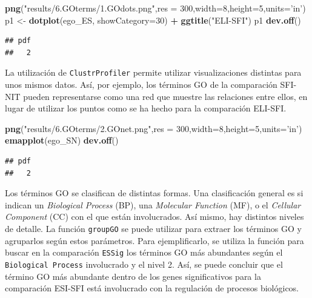 \documentclass[
]{article}
\newenvironment{Shaded}{\begin{snugshade}}{\end{snugshade}}
\newcommand{\DataTypeTok}[1]{\textcolor[rgb]{0.13,0.29,0.53}{#1}}
\newcommand{\DecValTok}[1]{\textcolor[rgb]{0.00,0.00,0.81}{#1}}
\newcommand{\KeywordTok}[1]{\textcolor[rgb]{0.13,0.29,0.53}{\textbf{#1}}}
\newcommand{\NormalTok}[1]{#1}
\newcommand{\OperatorTok}[1]{\textcolor[rgb]{0.81,0.36,0.00}{\textbf{#1}}}
\newcommand{\StringTok}[1]{\textcolor[rgb]{0.31,0.60,0.02}{#1}}
\begin{document}
\begin{Shaded}
\begin{Highlighting}[]
\KeywordTok{png}\NormalTok{(}\StringTok{"results/6.GOterms/1.GOdots.png"}\NormalTok{,}\DataTypeTok{res =} \DecValTok{300}\NormalTok{,}\DataTypeTok{width=}\DecValTok{8}\NormalTok{,}\DataTypeTok{height=}\DecValTok{5}\NormalTok{,}\DataTypeTok{units=}\StringTok{'in'}\NormalTok{)}
\NormalTok{p1 <-}\StringTok{ }\KeywordTok{dotplot}\NormalTok{(ego_ES, }\DataTypeTok{showCategory=}\DecValTok{30}\NormalTok{) }\OperatorTok{+}\StringTok{ }\KeywordTok{ggtitle}\NormalTok{(}\StringTok{"ELI-SFI"}\NormalTok{)}
\NormalTok{p1}
\KeywordTok{dev.off}\NormalTok{()}
\end{Highlighting}
\end{Shaded}

\begin{verbatim}
## pdf 
##   2
\end{verbatim}

La utilización de \texttt{ClustrProfiler} permite utilizar
visualizaciones distintas para unos mismos datos. Así, por ejemplo, los
términos GO de la comparación SFI-NIT pueden representarse como una red
que muestre las relaciones entre ellos, en lugar de utilizar los puntos
como se ha hecho para la comparación ELI-SFI.

\begin{Shaded}
\begin{Highlighting}[]
\KeywordTok{png}\NormalTok{(}\StringTok{"results/6.GOterms/2.GOnet.png"}\NormalTok{,}\DataTypeTok{res =} \DecValTok{300}\NormalTok{,}\DataTypeTok{width=}\DecValTok{8}\NormalTok{,}\DataTypeTok{height=}\DecValTok{5}\NormalTok{,}\DataTypeTok{units=}\StringTok{'in'}\NormalTok{)}
\KeywordTok{emapplot}\NormalTok{(ego_SN)}
\KeywordTok{dev.off}\NormalTok{()}
\end{Highlighting}
\end{Shaded}

\begin{verbatim}
## pdf 
##   2
\end{verbatim}

Los términos GO se clasifican de distintas formas. Una clasificación
general es si indican un \emph{Biological Process} (BP), una
\emph{Molecular Function} (MF), o el \emph{Cellular Component} (CC) con
el que están involucrados. Así mismo, hay distintos niveles de detalle.
La función \texttt{groupGO} se puede utilizar para extraer los términos
GO y agruparlos según estos parámetros. Para ejemplificarlo, se utiliza
la función para buscar en la comparación \texttt{ESSig} los términos GO
más abundantes según el \texttt{Biological\ Process} involucrado y el
nivel 2. Así, se puede concluir que el término GO más abundante dentro
de los genes significativos para la comparación ESI-SFI está involucrado
con la regulación de procesos biológicos.
\end{document}
